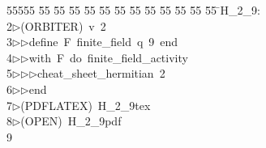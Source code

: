 %
%
\begin{tabbing}
55555 \= 55 \= 55 \= 55 \= 55 \= 55 \= 55 \= 55 \= 55 \= 55 \= 55 \= 55 \= 55 \= \>H\_2\_9:\\[0pt]
2\>$\triangleright$\>(ORBITER)\ v\ 2\ \\[0pt]
3\>$\triangleright$\>$\triangleright$\>define\ F\ finite\_field\ q\ 9\ end\ \\[0pt]
4\>$\triangleright$\>$\triangleright$\>with\ F\ do\ finite\_field\_activity\ \\[0pt]
5\>$\triangleright$\>$\triangleright$\>$\triangleright$\>cheat\_sheet\_hermitian\ 2\ \\[0pt]
6\>$\triangleright$\>$\triangleright$\>end\\[0pt]
7\>$\triangleright$\>(PDFLATEX)\ H\_2\_9tex\ \\[0pt]
8\>$\triangleright$\>(OPEN)\ H\_2\_9pdf\\[0pt]
9\>\end{tabbing}
